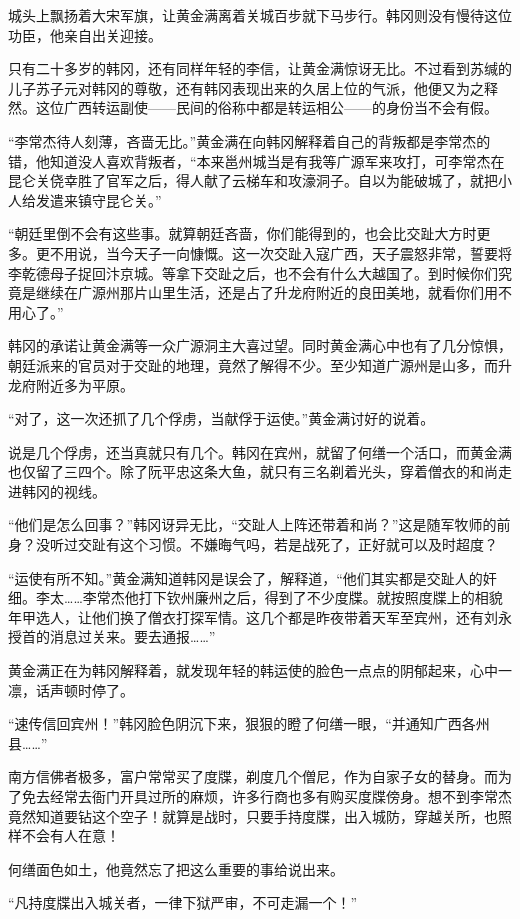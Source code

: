 城头上飘扬着大宋军旗，让黄金满离着关城百步就下马步行。韩冈则没有慢待这位功臣，他亲自出关迎接。

只有二十多岁的韩冈，还有同样年轻的李信，让黄金满惊讶无比。不过看到苏缄的儿子苏子元对韩冈的尊敬，还有韩冈表现出来的久居上位的气派，他便又为之释然。这位广西转运副使——民间的俗称中都是转运相公——的身份当不会有假。

“李常杰待人刻薄，吝啬无比。”黄金满在向韩冈解释着自己的背叛都是李常杰的错，他知道没人喜欢背叛者，“本来邕州城当是有我等广源军来攻打，可李常杰在昆仑关侥幸胜了官军之后，得人献了云梯车和攻濠洞子。自以为能破城了，就把小人给发遣来镇守昆仑关。”

“朝廷里倒不会有这些事。就算朝廷吝啬，你们能得到的，也会比交趾大方时更多。更不用说，当今天子一向慷慨。这一次交趾入寇广西，天子震怒非常，誓要将李乾德母子捉回汴京城。等拿下交趾之后，也不会有什么大越国了。到时候你们究竟是继续在广源州那片山里生活，还是占了升龙府附近的良田美地，就看你们用不用心了。”

韩冈的承诺让黄金满等一众广源洞主大喜过望。同时黄金满心中也有了几分惊惧，朝廷派来的官员对于交趾的地理，竟然了解得不少。至少知道广源州是山多，而升龙府附近多为平原。

“对了，这一次还抓了几个俘虏，当献俘于运使。”黄金满讨好的说着。

说是几个俘虏，还当真就只有几个。韩冈在宾州，就留了何缮一个活口，而黄金满也仅留了三四个。除了阮平忠这条大鱼，就只有三名剃着光头，穿着僧衣的和尚走进韩冈的视线。

“他们是怎么回事？”韩冈讶异无比，“交趾人上阵还带着和尚？”这是随军牧师的前身？没听过交趾有这个习惯。不嫌晦气吗，若是战死了，正好就可以及时超度？

“运使有所不知。”黄金满知道韩冈是误会了，解释道，“他们其实都是交趾人的奸细。李太……李常杰他打下钦州廉州之后，得到了不少度牒。就按照度牒上的相貌年甲选人，让他们换了僧衣打探军情。这几个都是昨夜带着天军至宾州，还有刘永授首的消息过关来。要去通报……”

黄金满正在为韩冈解释着，就发现年轻的韩运使的脸色一点点的阴郁起来，心中一凛，话声顿时停了。

“速传信回宾州！”韩冈脸色阴沉下来，狠狠的瞪了何缮一眼，“并通知广西各州县……”

南方信佛者极多，富户常常买了度牒，剃度几个僧尼，作为自家子女的替身。而为了免去经常去衙门开具过所的麻烦，许多行商也多有购买度牒傍身。想不到李常杰竟然知道要钻这个空子！就算是战时，只要手持度牒，出入城防，穿越关所，也照样不会有人在意！

何缮面色如土，他竟然忘了把这么重要的事给说出来。

“凡持度牒出入城关者，一律下狱严审，不可走漏一个！”

